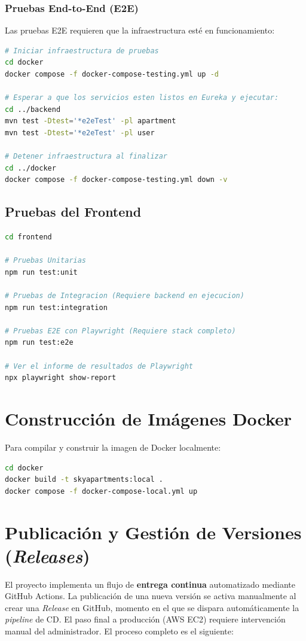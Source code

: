 \subsubsection*{Pruebas End-to-End (E2E)}
Las pruebas E2E requieren que la infraestructura esté en funcionamiento:
\begin{lstlisting}[language=bash]
# Iniciar infraestructura de pruebas
cd docker
docker compose -f docker-compose-testing.yml up -d

# Esperar a que los servicios esten listos en Eureka y ejecutar:
cd ../backend
mvn test -Dtest='*e2eTest' -pl apartment
mvn test -Dtest='*e2eTest' -pl user

# Detener infraestructura al finalizar
cd ../docker
docker compose -f docker-compose-testing.yml down -v
\end{lstlisting}

\subsection{Pruebas del Frontend}
\begin{lstlisting}[language=bash]
cd frontend

# Pruebas Unitarias
npm run test:unit

# Pruebas de Integracion (Requiere backend en ejecucion)
npm run test:integration

# Pruebas E2E con Playwright (Requiere stack completo)
npm run test:e2e

# Ver el informe de resultados de Playwright
npx playwright show-report
\end{lstlisting}

\section{Construcción de Imágenes Docker}
Para compilar y construir la imagen de Docker localmente:
\begin{lstlisting}[language=bash]
cd docker
docker build -t skyapartments:local .
docker compose -f docker-compose-local.yml up
\end{lstlisting}

\section{Publicación y Gestión de Versiones (\textit{Releases})}
El proyecto implementa un flujo de \textbf{entrega continua} automatizado mediante GitHub Actions. La publicación de una nueva versión se activa manualmente al crear una \textit{Release} en GitHub, momento en el que se dispara automáticamente la \textit{pipeline} de CD. El paso final a producción (AWS EC2) requiere intervención manual del administrador. El proceso completo es el siguiente:

